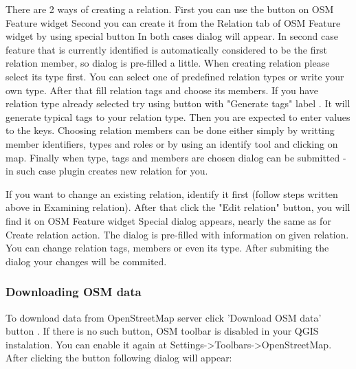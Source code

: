 
There are 2 ways of creating a relation.
First you can use the button on OSM Feature widget   
Second you can create it from the Relation tab of OSM Feature widget by using
special button   
In both cases dialog will appear. In second case feature that is currently
identified is automatically considered to be the first relation member, so
dialog is pre-filled a little.
When creating relation please select its type first. You can select one of
predefined relation types or write your own type. After that fill relation
tags and choose its members.
If you have relation type already selected try using button with "Generate
tags" label  . It will generate typical tags to your relation type. Then you
are expected to enter values to the keys.
Choosing relation members can be done either simply by writting member
identifiers, types and roles or by using an identify tool      and clicking
on map.
Finally when type, tags and members are chosen dialog can be submitted - in
such case plugin creates new relation for you.


If you want to change an existing relation, identify it first (follow steps
written above in Examining relation). After that click the "Edit relation"
button, you will find it on OSM Feature widget   
Special dialog appears, nearly the same as for Create relation action.
The dialog is pre-filled with information on given relation. You can change
relation tags, members or even its type. After submiting the dialog your
changes will be commited.

\subsubsection{Downloading OSM data}  

To download data from OpenStreetMap server click 'Download OSM data' button
.
If there is no such button, OSM toolbar is disabled in your QGIS instalation.
You can enable it again at Settings->Toolbars->OpenStreetMap.
After clicking the button following dialog will appear:

